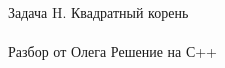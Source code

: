 {\large Задача H. Квадратный корень} 
\\
\\
Разбор от Олега
\newpage
{\large Решение на С++}
\\
\\

